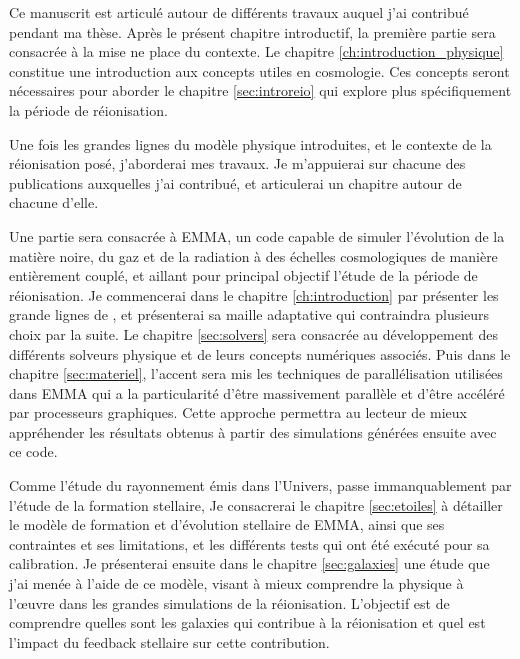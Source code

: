 Ce manuscrit est articulé autour de différents travaux auquel j'ai contribué pendant ma thèse.
Après le présent chapitre introductif, la première partie sera consacrée à la mise ne place du contexte.
Le chapitre \ref{ch:introduction_physique} constitue une introduction aux concepts utiles en cosmologie.
Ces concepts seront nécessaires pour aborder le chapitre \ref{sec:introreio} qui explore plus spécifiquement la période de réionisation.

Une fois les grandes lignes du modèle physique introduites, et le contexte de la réionisation posé, j'aborderai mes travaux.
Je m'appuierai sur chacune des publications auxquelles j'ai contribué, et articulerai un chapitre autour de chacune d'elle. 

Une partie sera consacrée à EMMA, un code capable de simuler l'évolution de la matière noire, du gaz et de la radiation à des échelles cosmologiques de manière entièrement couplé, et aillant pour principal objectif l'étude de la période de réionisation.
Je commencerai dans le chapitre \ref{ch:introduction} par présenter les grande lignes de \emma, et présenterai sa maille adaptative qui contraindra plusieurs choix par la suite.
Le chapitre \ref{sec:solvers} sera consacrée au développement des différents solveurs physique et de leurs concepts numériques associés.
Puis dans le chapitre \ref{sec:materiel}, l'accent sera mis les techniques de parallélisation utilisées dans EMMA qui a la particularité d'être massivement parallèle et d'être accéléré par processeurs graphiques.
Cette approche permettra au lecteur de mieux appréhender les résultats obtenus à partir des simulations générées ensuite avec ce code.

Comme l'étude du rayonnement émis dans l'Univers, passe immanquablement par l'étude de la formation stellaire,
Je consacrerai le chapitre \ref{sec:etoiles} à détailler le modèle de formation et d'évolution stellaire de EMMA, ainsi que ses contraintes et ses limitations, et les différents tests qui ont été exécuté pour sa calibration.
Je présenterai ensuite dans le chapitre \ref{sec:galaxies} une étude que j'ai menée à l'aide de ce modèle, visant à mieux comprendre la physique à l'œuvre dans les grandes simulations de la réionisation.
L'objectif est de comprendre quelles sont les galaxies qui contribue à la réionisation et quel est l'impact du feedback stellaire sur cette contribution.


